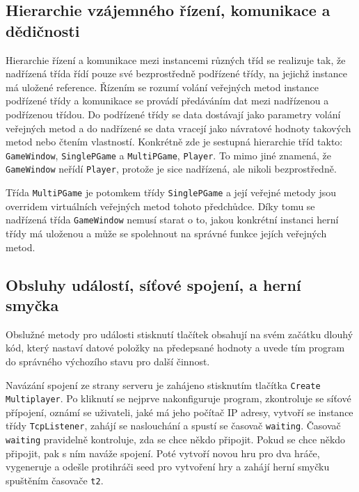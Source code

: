 \documentclass[12pt]{article}
\begin{document}
 \subsection*{Hierarchie vzájemného řízení, komunikace a dědičnosti}
 
 Hierarchie řízení a komunikace mezi instancemi různých tříd se realizuje tak, že nadřízená třída řídí pouze své bezprostředně podřízené třídy, na jejichž instance má uložené reference. Řízením se rozumí volání veřejných metod instance podřízené třídy a komunikace se provádí předáváním dat mezi nadřízenou a podřízenou třídou. Do podřízené třídy se data dostávají jako parametry volání veřejných metod a do nadřízené se data vracejí jako návratové hodnoty takových metod nebo čtením vlastností. Konkrétně zde je sestupná hierarchie tříd takto: \texttt{GameWindow}, \texttt{SinglePGame} a \texttt{MultiPGame}, \texttt{Player}. To mimo jiné znamená, že \texttt{GameWindow} neřídí \texttt{Player}, protože je sice nadřízená, ale nikoli bezprostředně.
 
 Třída \texttt{MultiPGame} je potomkem třídy \texttt{SinglePGame} a její veřejné metody jsou overridem virtuálních veřejných metod tohoto předchůdce. Díky tomu se nadřízená třída \texttt{GameWindow} nemusí starat o to, jakou konkrétní instanci herní třídy má uloženou a může se spolehnout na správné funkce jejích veřejných metod.
 
 \subsection*{Obsluhy událostí, síťové spojení, a herní smyčka}
 
 Obslužné metody pro události stisknutí tlačítek obsahují na svém začátku dlouhý kód, který nastaví datové položky na předepsané hodnoty a uvede tím program do správného výchozího stavu pro další činnost.
 
 Navázání spojení ze strany serveru je zahájeno stisknutím tlačítka \texttt{Create Multiplayer}. Po kliknutí se nejprve nakonfiguruje program, zkontroluje se síťové přípojení, oznámí se uživateli, jaké má jeho počítač IP adresy, vytvoří se instance třídy \texttt{TcpListener}, zahájí se naslouchání a spustí se časovač \texttt{waiting}. Časovač \texttt{waiting} pravidelně kontroluje, zda se chce někdo připojit. Pokud se chce někdo připojit, pak s ním naváže spojení. Poté vytvoří novou hru pro dva hráče, vygeneruje a odešle protihráči seed pro vytvoření hry a zahájí herní smyčku spuštěním časovače \texttt{t2}.
 
\end{document}
